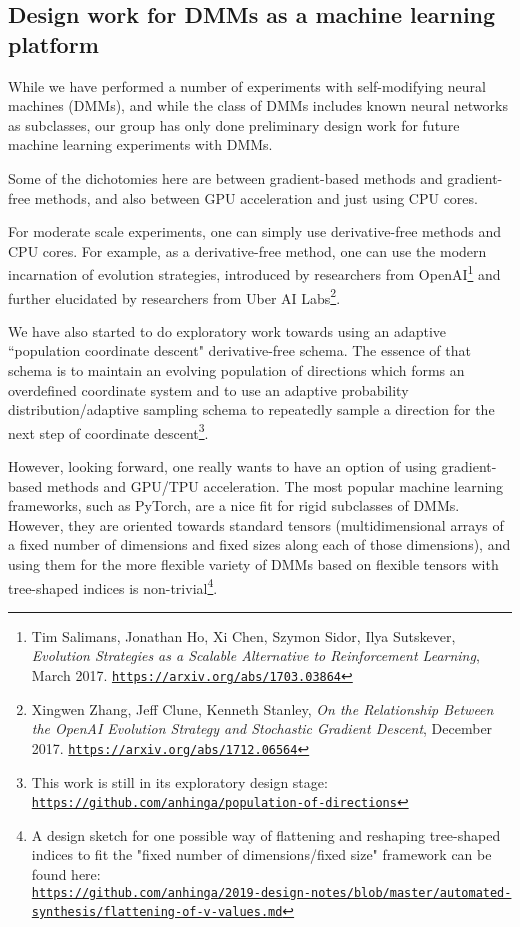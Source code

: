 \documentclass{article}
\begin{document}
\subsection{Design work for DMMs as a machine learning platform}

While we have performed a number of experiments with self-modifying neural machines (DMMs),
and while the class of DMMs includes known neural networks as subclasses,
our group has only done preliminary design work for future machine learning experiments with DMMs.

Some of the dichotomies here are between gradient-based methods and gradient-free methods,
and also between GPU acceleration and just using CPU cores.

For moderate scale experiments, one can simply use derivative-free methods and CPU cores.
For example, as a derivative-free method, one can use the modern incarnation of evolution strategies, introduced by researchers from OpenAI\footnote{Tim Salimans, Jonathan Ho, Xi Chen, Szymon Sidor, Ilya Sutskever, {\em Evolution Strategies as a Scalable Alternative to Reinforcement Learning}, March 2017.
\href{https://arxiv.org/abs/1703.03864}{\tt https://arxiv.org/abs/1703.03864}}  and
further elucidated by researchers from Uber AI Labs\footnote{Xingwen Zhang, Jeff Clune, Kenneth Stanley,
{\em On the Relationship Between the OpenAI Evolution Strategy and Stochastic Gradient Descent}, December 2017.
\href{https://arxiv.org/abs/1712.06564}{\tt https://arxiv.org/abs/1712.06564}}. 

We have also started to do
exploratory work towards using an adaptive ``population coordinate descent" derivative-free schema. The essence of
that schema is to maintain an evolving
population of directions which forms an overdefined coordinate system and to use an adaptive probability distribution/adaptive
sampling schema to repeatedly sample a direction for the next step of coordinate descent\footnote{This work is
still in its exploratory design stage: 
\href{https://github.com/anhinga/population-of-directions}{\tt https://github.com/anhinga/population-of-directions}}.

However, looking forward, one really wants to have an option of using gradient-based methods and GPU/TPU
acceleration. The most popular machine learning frameworks, such as PyTorch, are a nice fit for rigid subclasses
of DMMs. However, they are oriented towards standard tensors (multidimensional arrays of a
fixed number of dimensions and fixed sizes along each of those dimensions), and using them for the more flexible variety of DMMs based on flexible tensors
with tree-shaped indices is non-trivial\footnote{A design sketch for one possible way of flattening and reshaping
tree-shaped indices to fit the "fixed number of dimensions/fixed size" framework can be found
here:\\
\href{https://github.com/anhinga/2019-design-notes/blob/master/automated-synthesis/flattening-of-v-values.md}
{\tt https://github.com/anhinga/2019-design-notes/blob/master/automated-synthesis/flattening-of-v-values.md}}.
\end{document}
